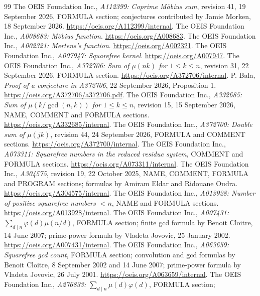 \documentclass[11pt]{article}
\newcommand{\mob}{\mu}
\begin{document}
\clearpage
\begin{thebibliography}{99}
\small
\setlength{\itemsep}{0pt}
 The OEIS Foundation Inc.,
\emph{A112399: Coprime M\"obius sum}, revision 41,
19 September 2026, FORMULA section; conjectures contributed by
Jamie Morken, 18 September 2026.
\url{https://oeis.org/A112399/internal}.
 The OEIS Foundation Inc.,
\emph{A008683: M\"obius function}.
\url{https://oeis.org/A008683}.
 The OEIS Foundation Inc.,
\emph{A002321: Mertens's function}.
\url{https://oeis.org/A002321}.
 The OEIS Foundation Inc.,
\emph{A007947: Squarefree kernel}.
\url{https://oeis.org/A007947}.
 The OEIS Foundation Inc.,
\emph{A372706: Sum of $\mob(nk)$ for $1\leq k\leq n$}, revision 31,
22 September 2026, FORMULA section.
\url{https://oeis.org/A372706/internal}.
 P. Bala,
\emph{Proof of a conjecture in A372706}, 22 September 2026,
Proposition 1.
\url{https://oeis.org/A372706/a372706.pdf}.
 The OEIS Foundation Inc.,
\emph{A332685: Sum of $\mob(k/\gcd(n,k))$ for $1\leq k\leq n$},
revision 15, 15 September 2026, NAME, COMMENT and FORMULA sections.
\url{https://oeis.org/A332685/internal}.
 The OEIS Foundation Inc.,
\emph{A372700: Double sum of $\mob(jk)$}, revision 44,
24 September 2026, FORMULA and COMMENT sections.
\url{https://oeis.org/A372700/internal}.
 The OEIS Foundation Inc.,
\emph{A073311: Squarefree numbers in the reduced residue system},
COMMENT and FORMULA sections.
\url{https://oeis.org/A073311/internal}.
 The OEIS Foundation Inc.,
\emph{A304575}, revision 19, 22 October 2025, NAME, COMMENT,
FORMULA and PROGRAM sections; formulas by Amiram Eldar and Ridouane Oudra.
\url{https://oeis.org/A304575/internal}.
 The OEIS Foundation Inc.,
\emph{A013928: Number of positive squarefree numbers $<n$},
NAME and FORMULA sections.
\url{https://oeis.org/A013928/internal}.
 The OEIS Foundation Inc.,
\emph{A007431: $\sum_{d\mid n}\varphi(d)\mob(n/d)$},
FORMULA section; finite gcd formula by Benoit Cloitre, 14 June 2007;
prime-power formula by Vladeta Jovovic, 25 January 2002.
\url{https://oeis.org/A007431/internal}.
 The OEIS Foundation Inc.,
\emph{A063659: Squarefree gcd count}, FORMULA section;
convolution and gcd formulas by Benoit Cloitre, 8 September 2002 and
14 June 2007; prime-power formula by Vladeta Jovovic, 26 July 2001.
\url{https://oeis.org/A063659/internal}.
 The OEIS Foundation Inc.,
\emph{A276833: $\sum_{d\mid n}\mob(d)\varphi(d)$}, FORMULA section;

\end{thebibliography}
\end{document}
